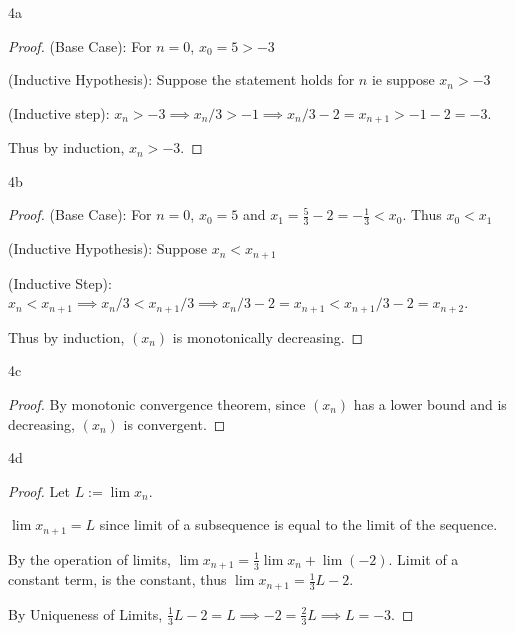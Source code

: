 \documentclass{article}
\begin{document}
\bigskip

\begin{PROB}{4a}\label{Problem 4a.}
\end{PROB}
\begin{proof}
    (Base Case): For $n = 0$, $x_0 = 5 > -3$

    (Inductive Hypothesis): Suppose the statement holds for $n $ ie suppose $x_{n} > -3$

    (Inductive step): $x_{n} > -3 \implies x_{n} / 3 > -1 \implies x_{n}/3 - 2 = x_{n + 1} > -1 - 2 = -3$. 
    
    Thus by induction, $x_n > -3$. 
\end{proof}
\begin{PROB}{4b}\label{Problem 4b.}
\end{PROB}
\begin{proof}
    (Base Case): For $n = 0$, $x_0 = 5$ and $x_1 = \frac{5}{3} - 2 = -\frac{1}{3} < x_0$. Thus $x_0 < x_1$
    
    (Inductive Hypothesis): Suppose $x_{n} < x_{n + 1}$
    
    (Inductive Step): $x_{n} < x_{n + 1} \implies x_{n} / 3 < x_{n + 1} / 3 \implies x_{n} / 3 - 2 = x_{n + 1} < x_{n + 1} /3 - 2 = x_{n + 2}$.
    
    Thus by induction, $(x_n)$ is monotonically decreasing.  
\end{proof}
\begin{PROB}{4c}\label{Problem 4c.}
     
\end{PROB}
\begin{proof}
    By monotonic convergence theorem, since $(x_n)$ has a lower bound and is decreasing, $(x_n)$ is convergent.  
\end{proof}
\begin{PROB}{4d}\label{Problem 4d.}
\end{PROB}
\begin{proof}
    Let $L := \lim x_n$. 
    
    $\lim x_{n + 1} = L$ since limit of a subsequence is equal to the limit of the sequence. 
    
    By the operation of limits, $\lim x_{n + 1} = \frac{1}{3}\lim x_n + \lim (-2)$. Limit of a constant term, is the constant, thus $\lim x_{n + 1}= \frac{1}{3}L - 2$. 
    
    By Uniqueness of Limits, $\frac{1}{3}L - 2 = L \implies -2 = \frac{2}{3}L \implies L = -3$.  
\end{proof}
\end{document}
